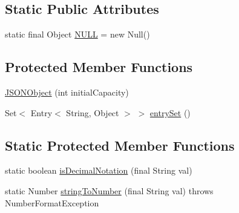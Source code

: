 \subsection*{Static Public Attributes}
\begin{DoxyCompactItemize}
\item 
static final Object \hyperlink{classorg_1_1json_1_1JSONObject_a01c74a31a1abfd34ab13beb9347855ac}{N\-U\-L\-L} = new Null()
\end{DoxyCompactItemize}
\subsection*{Protected Member Functions}
\begin{DoxyCompactItemize}
\item 
\hyperlink{classorg_1_1json_1_1JSONObject_a4e9429020d2998c7be3de1ab691dd67f}{J\-S\-O\-N\-Object} (int initial\-Capacity)
\item 
Set$<$ Entry$<$ String, Object $>$ $>$ \hyperlink{classorg_1_1json_1_1JSONObject_a004c3da5b5bfc5fc768cc1346afb4ac1}{entry\-Set} ()
\end{DoxyCompactItemize}
\subsection*{Static Protected Member Functions}
\begin{DoxyCompactItemize}
\item 
static boolean \hyperlink{classorg_1_1json_1_1JSONObject_a17e05be71de51c2af80323ceda1a5449}{is\-Decimal\-Notation} (final String val)
\item 
static Number \hyperlink{classorg_1_1json_1_1JSONObject_a0c62c982cd3f51d62218599feabc04b7}{string\-To\-Number} (final String val)  throws Number\-Format\-Exception 
\end{DoxyCompactItemize}


